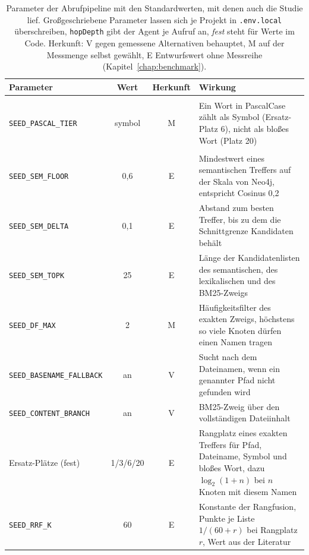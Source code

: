 \begin{table}[htbp]
  \centering
  \caption{Parameter der Abrufpipeline mit den Standardwerten, mit denen auch die Studie lief. Großgeschriebene Parameter lassen sich je Projekt in \texttt{.env.local} überschreiben, \texttt{hopDepth} gibt der Agent je Aufruf an, \emph{fest} steht für Werte im Code. Herkunft: V gegen gemessene Alternativen behauptet, M auf der Messmenge selbst gewählt, E Entwurfswert ohne Messreihe (Kapitel~\ref{chap:benchmark}).}
  \label{tab:abrufparameter}
  \footnotesize
  \begin{tabularx}{\textwidth}{>{\raggedright\arraybackslash}p{4.3cm}cc>{\raggedright\arraybackslash}X}
    \toprule
    Parameter & Wert & Herkunft & Wirkung \\
    \midrule
    \multicolumn{4}{l}{\emph{Stufe 1: Bezeichner}} \\
    \texttt{SEED\_PASCAL\_TIER} & symbol & M & Ein Wort in PascalCase zählt als Symbol (Ersatz-Platz 6), nicht als bloßes Wort (Platz 20) \\
    \midrule
    \multicolumn{4}{l}{\emph{Stufe 2: Seeds}} \\
    \texttt{SEED\_SEM\_FLOOR} & 0{,}6 & E & Mindestwert eines semantischen Treffers auf der Skala von Neo4j, entspricht Cosinus 0,2 \\
    \texttt{SEED\_SEM\_DELTA} & 0{,}1 & E & Abstand zum besten Treffer, bis zu dem die Schnittgrenze Kandidaten behält \\
    \texttt{SEED\_SEM\_TOPK} & 25 & E & Länge der Kandidatenlisten des semantischen, des lexikalischen und des BM25-Zweigs \\
    \texttt{SEED\_DF\_MAX} & 2 & M & Häufigkeitsfilter des exakten Zweigs, höchstens so viele Knoten dürfen einen Namen tragen \\
    \texttt{SEED\_BASENAME\_FALLBACK} & an & V & Sucht nach dem Dateinamen, wenn ein genannter Pfad nicht gefunden wird \\
    \texttt{SEED\_CONTENT\_BRANCH} & an & V & BM25-Zweig über den vollständigen Dateiinhalt \\
    Ersatz-Plätze (fest) & 1/3/6/20 & E & Rangplatz eines exakten Treffers für Pfad, Dateiname, Symbol und bloßes Wort, dazu $\log_2(1 + n)$ bei $n$ Knoten mit diesem Namen \\
    \texttt{SEED\_RRF\_K} & 60 & E & Konstante der Rangfusion, Punkte je Liste $1/(60 + r)$ bei Rangplatz $r$, Wert aus der Literatur~\parencite{cormack2009rrf} \\

\end{tabularx}
\end{table}
